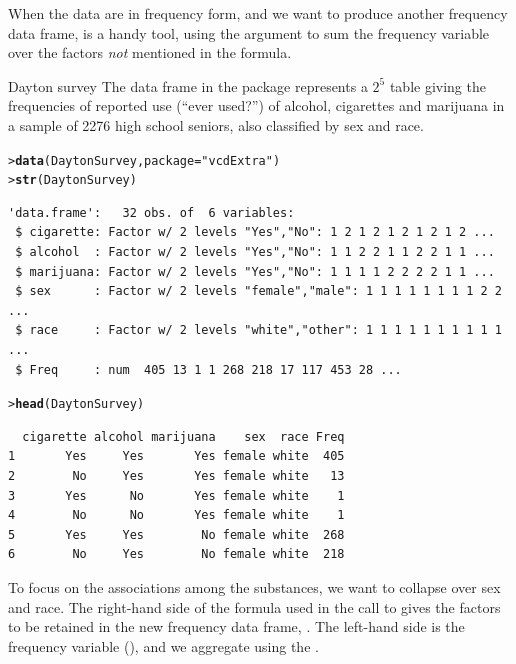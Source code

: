 \documentclass[10pt,krantz2]{krantz}\usepackage[]{graphicx}\usepackage[]{color}
\makeatletter
\newcommand{\hlstr}[1]{\textcolor[rgb]{0.192,0.494,0.8}{#1}}%
\newcommand{\hlstd}[1]{\textcolor[rgb]{0.345,0.345,0.345}{#1}}%
\newcommand{\hlkwc}[1]{\textcolor[rgb]{0.333,0.667,0.333}{#1}}%
\newcommand{\hlkwd}[1]{\textcolor[rgb]{0.737,0.353,0.396}{\textbf{#1}}}%
\newenvironment{kframe}{%
 \def\at@end@of@kframe{}%
 \ifinner\ifhmode%
  \def\at@end@of@kframe{\end{minipage}}%
  \begin{minipage}{\columnwidth}%
 \fi\fi%
 \def\FrameCommand##1{\hskip\@totalleftmargin \hskip-\fboxsep
 \colorbox{shadecolor}{##1}\hskip-\fboxsep
     \hskip-\linewidth \hskip-\@totalleftmargin \hskip\columnwidth}%
 \MakeFramed {\advance\hsize-\width
   \@totalleftmargin\z@ \linewidth\hsize
   \@setminipage}}%
 {\par\unskip\endMakeFramed%
 \at@end@of@kframe}
\newenvironment{knitrout}{}{} %
\renewenvironment{knitrout}{\small\renewcommand{\baselinestretch}{.85}}{} %
\makeatother
\begin{document}
When the data are in frequency form, and we want to produce another
frequency data frame,  is a handy tool, using
the argument  to sum the frequency variable over the
factors \emph{not} mentioned in the formula.

\begin{Example}[dayton1]{Dayton survey}
The data frame  in the  package represents a
$2^5$ table giving the frequencies of reported use (``ever used?'') of
alcohol, cigarettes and marijuana in a sample of 2276 high school seniors,
also classified by sex and race.

\begin{knitrout}
\color{fgcolor}\begin{kframe}
\begin{alltt}
\hlstd{> }\hlkwd{data}\hlstd{(DaytonSurvey,} \hlkwc{package} \hlstd{=} \hlstr{"vcdExtra"}\hlstd{)}
\hlstd{> }\hlkwd{str}\hlstd{(DaytonSurvey)}
\end{alltt}
\begin{verbatim}
'data.frame':	32 obs. of  6 variables:
 $ cigarette: Factor w/ 2 levels "Yes","No": 1 2 1 2 1 2 1 2 1 2 ...
 $ alcohol  : Factor w/ 2 levels "Yes","No": 1 1 2 2 1 1 2 2 1 1 ...
 $ marijuana: Factor w/ 2 levels "Yes","No": 1 1 1 1 2 2 2 2 1 1 ...
 $ sex      : Factor w/ 2 levels "female","male": 1 1 1 1 1 1 1 1 2 2 ...
 $ race     : Factor w/ 2 levels "white","other": 1 1 1 1 1 1 1 1 1 1 ...
 $ Freq     : num  405 13 1 1 268 218 17 117 453 28 ...
\end{verbatim}
\begin{alltt}
\hlstd{> }\hlkwd{head}\hlstd{(DaytonSurvey)}
\end{alltt}
\begin{verbatim}
  cigarette alcohol marijuana    sex  race Freq
1       Yes     Yes       Yes female white  405
2        No     Yes       Yes female white   13
3       Yes      No       Yes female white    1
4        No      No       Yes female white    1
5       Yes     Yes        No female white  268
6        No     Yes        No female white  218
\end{verbatim}
\end{kframe}
\end{knitrout}

To focus on the associations among the
substances, we want to collapse over sex and race. The right-hand side of the formula
used in the call to  gives the factors to be retained in the
new frequency data frame, .  The left-hand side is
the frequency variable (), and we aggregate using the
.


\end{Example}
\end{document}
